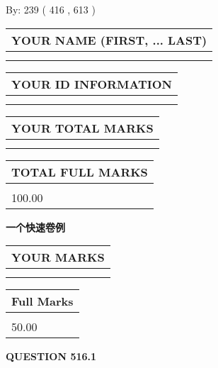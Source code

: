 \documentclass{ctexart}
\begin{document}
   
\hspace{1.0in} By: 
 239 ( 416 ,  613 )
   
   
   
   
\newpage 
\setcounter{page}{ 
   516001 } 
   
   
   
   
\noindent\begin{tabular}{|l|}
\hline
YOUR NAME (FIRST, ... LAST)  \\
\hline
 \\ 
 \\ 
\hline
\end{tabular}
\hspace{0.05in} \begin{tabular}{|l|}
\hline
 YOUR   ID   INFORMATION  \\
\hline
 \\ 
 \\ 
\hline
\end{tabular}
   
   
\vspace{0.2in}\noindent\begin{tabular}{|l|}
\hline
YOUR TOTAL MARKS  \\
\hline
 \\ 
 \\ 
\hline
\end{tabular}
\hspace{0.05in} \begin{tabular}{|l|}
\hline
TOTAL FULL MARKS  \\
\hline
 \\ 
100.00 \\
\hline
\end{tabular}
   
   
 \vspace{0.2in}
{\LARGE {\textbf{ 一个快速卷例}}}
   
   
  
\vspace{0.2in}
  
\noindent\begin{tabular}{|l|}
\hline
 YOUR MARKS  \\
\hline
 \\ 
 \\ 
\hline
\end{tabular}
\hspace{0.05in} \begin{tabular}{|l|}
\hline
 Full Marks  \\
\hline
 \\ 
50.00 \\
\hline
\end{tabular}
{\textbf{\Large{QUESTION
516.1 
}}}
  
\end{document}

